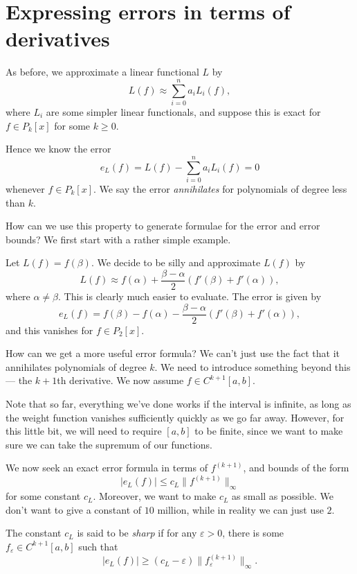 \documentclass[a4paper]{article}
\begin{document}
\section{Expressing errors in terms of derivatives}
As before, we approximate a linear functional $L$ by
\[
  L(f) \approx \sum_{i = 0}^n a_i L_i(f),
\]
where $L_i$ are some simpler linear functionals, and suppose this is exact for $f \in P_k[x]$ for some $k \geq 0$.

Hence we know the error
\[
  e_L(f) = L(f) - \sum_{i = 0}^n a_i L_i(f) = 0
\]
whenever $f \in P_k[x]$. We say the error \emph{annihilates} for polynomials of degree less than $k$.

How can we use this property to generate formulae for the error and error bounds? We first start with a rather simple example.
\begin{eg}
  Let $L(f) = f(\beta)$. We decide to be silly and approximate $L(f)$ by
  \[
    L(f) \approx f(\alpha) + \frac{\beta - \alpha}{2} (f'(\beta) + f'(\alpha)),
  \]
  where $\alpha \not= \beta$. This is clearly much easier to evaluate. The error is given by
  \[
    e_L(f) = f(\beta) - f(\alpha) - \frac{\beta - \alpha}{2} (f'(\beta) + f'(\alpha)),
  \]
  and this vanishes for $f \in P_2[x]$.
\end{eg}
How can we get a more useful error formula? We can't just use the fact that it annihilates polynomials of degree $k$. We need to introduce something beyond this --- the $k + 1$th derivative. We now assume $f \in C^{k + 1}[a, b]$.

Note that so far, everything we've done works if the interval is infinite, as long as the weight function vanishes sufficiently quickly as we go far away. However, for this little bit, we will need to require $[a, b]$ to be finite, since we want to make sure we can take the supremum of our functions.

We now seek an exact error formula in terms of $f^{(k + 1)}$, and bounds of the form
\[
  |e_L(f)| \leq c_L \|f^{(k + 1)}\|_{\infty}
\]
for some constant $c_L$. Moreover, we want to make $c_L$ as small as possible. We don't want to give a constant of $10$ million, while in reality we can just use $2$.

\begin{defi}
  The constant $c_L$ is said to be \emph{sharp} if for any $\varepsilon > 0$, there is some $f_{\varepsilon} \in C^{k + 1}[a, b]$ such that
  \[
    |e_L(f)| \geq (c_L - \varepsilon)\|f^{(k + 1)}_\varepsilon\|_{\infty}.
  \]
\end{defi}
\end{document}
